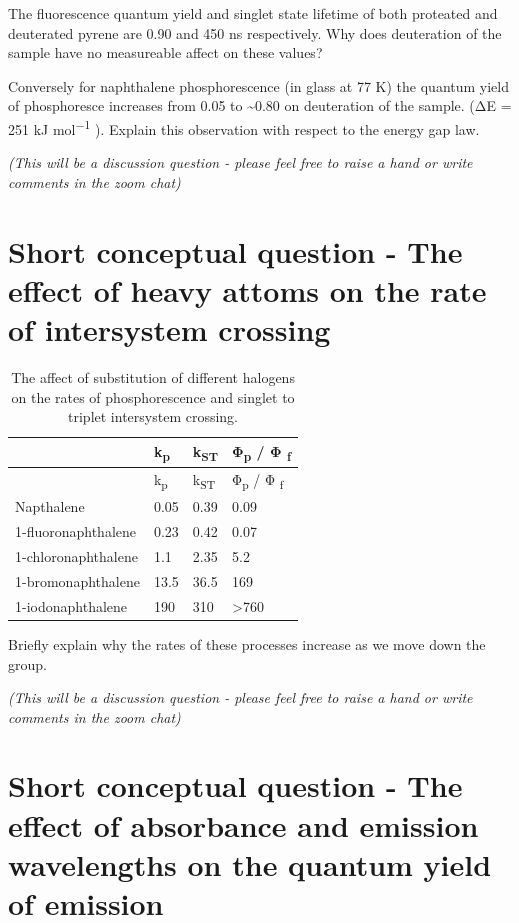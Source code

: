 \documentclass[
]{book}
\begin{document}
The fluorescence quantum yield and singlet state lifetime of both proteated and deuterated pyrene are 0.90 and 450 ns respectively. Why does deuteration of the sample have no measureable affect on these values?

Conversely for naphthalene phosphorescence (in glass at 77 K) the quantum yield of phosphoresce increases from 0.05 to \textasciitilde0.80 on deuteration of the sample. (ΔE = 251 kJ mol\textsuperscript{−1} ). Explain this observation with respect to the energy gap law.

\emph{(This will be a discussion question - please feel free to raise a hand or write comments in the zoom chat)}

\hypertarget{sec:heavy}{%
\section{Short conceptual question - The effect of heavy attoms on the rate of intersystem crossing}\label{sec:heavy}}

\begin{longtable}[]{@{}llll@{}}
\caption{\label{tab:heavyatom} The affect of substitution of different halogens on the rates of phosphorescence and singlet to triplet intersystem crossing.}\tabularnewline
\toprule
& k\textsubscript{p} & k\textsubscript{ST} & Φ\textsubscript{p} / Φ \textsubscript{f}\tabularnewline
\midrule
\endfirsthead
\toprule
& k\textsubscript{p} & k\textsubscript{ST} & Φ\textsubscript{p} / Φ \textsubscript{f}\tabularnewline
\midrule
\endhead
Napthalene & 0.05 & 0.39 & 0.09\tabularnewline
1-fluoronaphthalene & 0.23 & 0.42 & 0.07\tabularnewline
1-chloronaphthalene & 1.1 & 2.35 & 5.2\tabularnewline
1-bromonaphthalene & 13.5 & 36.5 & 169\tabularnewline
1-iodonaphthalene & 190 & 310 & \textgreater760\tabularnewline
\bottomrule
\end{longtable}

Briefly explain why the rates of these processes increase as we move down the group.

\emph{(This will be a discussion question - please feel free to raise a hand or write comments in the zoom chat)}

\hypertarget{sec:osphen}{%
\section{Short conceptual question - The effect of absorbance and emission wavelengths on the quantum yield of emission}\label{sec:osphen}}
\end{document}
